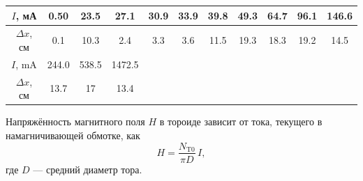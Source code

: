 \documentclass[12pt]{article}
\begin{document}
\begin{table}[h!]
	\centering
	\begin{tabular}{|c|c|c|c|c|c|c|c|c|c|c|}
	\hline
		$I$, мА & 0.50 & 23.5 & 27.1 & 30.9 & 33.9 & 39.8 & 49.3 & 64.7 & 96.1 & 146.6 \\
	\hline
		$\Delta x$, см & 0.1 & 10.3 & 2.4 & 3.3 & 3.6 & 11.5 & 19.3 & 18.3 & 19.2 & 14.5\\
	\hline	
	   $I$, mA & 244.0 & 538.5 & 1472.5 \\	   
	\cline{1-4}
		$\Delta x$, см & 13.7 & 17	& 13.4\\		  
	\cline{1-4}
	\end{tabular}
\end{table}
\par
	Напряжённость магнитного поля $H$ в тороиде зависит от тока, текущего в намагничивающей обмотке, как
	\begin{equation}
		H = \frac{N_\text{T0}}{\pi D} \, I, \label{H}
	\end{equation}
где $D$ --- средний диаметр тора.	
\end{document}
